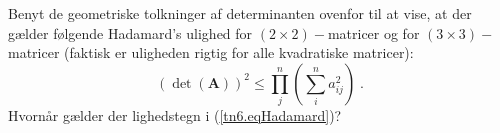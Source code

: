 \begin{exercise}
Benyt de geometriske tolkninger af determinanten ovenfor til at vise, at der gælder følgende Hadamard's ulighed for $(2\times 2)-$matricer og for  $(3\times 3)-$matricer
(faktisk er uligheden rigtig for alle kvadratiske matricer):
\begin{equation} \label{tn6.eqHadamard}
(\det(\mathbf{A}))^{2} \leq \prod_{j}^{n}\left(\sum_{i}^{n}a_{ij}^{2}\right) \;.
\end{equation}
Hvornår gælder der lighedstegn i (\ref{tn6.eqHadamard})?
\end{exercise}




 